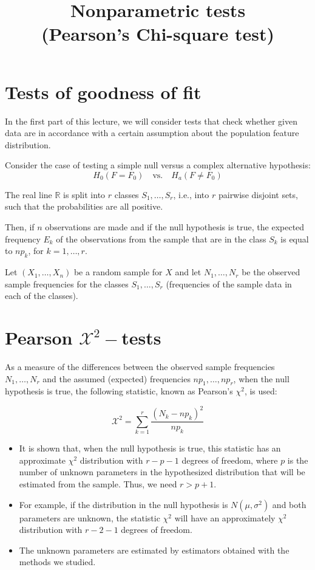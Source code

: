 \documentclass[a4paper, 12pt]{article}
\title{
  \vspace{-1.5cm}
  \textbf{Nonparametric tests\\(Pearson's Chi-square test)}
  \vspace{-1.5cm}
}
\date{}
\begin{document}
\maketitle

\section{Tests of goodness of fit}

In the first part of this lecture, we will consider tests that check whether
given data are in accordance with a certain assumption about the population
feature distribution.

Consider the case of testing a simple null versus a complex alternative
hypothesis:
\[
H_0 (F = F_0) \quad \text{vs.} \quad H_a (F \neq F_0)
\]

The real line $\mathbb{R}$ is split into $r$ classes $S_1, \dots, S_r$, i.e., into $r$ pairwise disjoint sets, such that the probabilities are all positive.\

Then, if $n$ observations are made and if the null hypothesis is true, the expected frequency $E_k$ of the observations from the sample that are in the class $S_k$ is equal to $np_k$, for $k = 1, \dots, r$.

Let $(X_1, \dots, X_n)$ be a random sample for $X$ and let $N_1, \dots, N_r$ be the observed sample frequencies for the classes $S_1, \dots, S_r$ (frequencies of the sample data in each of the classes).

\section{Pearson $\mathcal{X}^2-$tests}

As a measure of the differences between the observed sample frequencies $N_1, \dots, N_r$ and the assumed (expected) frequencies $np_1, \dots, np_r$, when the null hypothesis is true, the following statistic, known as Pearson's $\chi^2$, is used:

\[
\mathcal{X}^2 = \sum_{k=1}^{r} \frac{(N_k - np_k)^2}{np_k}
\]

\begin{itemize}
    \item It is shown that, when the null hypothesis is true, this statistic has an approximate $\chi^2$ distribution with $r - p - 1$ degrees of freedom, where $p$ is the number of unknown parameters in the hypothesized distribution that will be estimated from the sample. Thus, we need $r > p + 1$.
    \item For example, if the distribution in the null hypothesis is $N(\mu, \sigma^2)$ and both parameters are unknown, the statistic $\chi^2$ will have an approximately $\chi^2$ distribution with $r - 2 - 1$ degrees of freedom.
    \item The unknown parameters are estimated by estimators obtained with the methods we studied.
\end{itemize}
\end{document}
